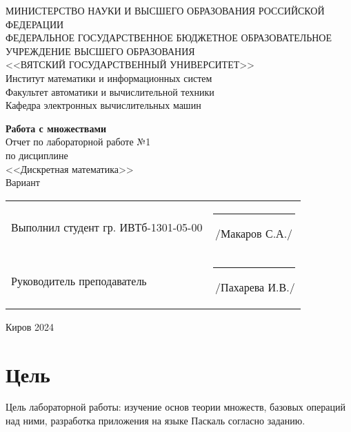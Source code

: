 \documentclass[a4paper,14pt]{extarticle}
\begin{document}
	\newpage\thispagestyle{empty}
	\begin{center}
		\MakeUppercase{
			Министерство науки и высшего образования Российской Федерации\\
			Федеральное государственное бюджетное образовательное учреждение высшего образования\\
			<<Вятский Государственный Университет>>\\
		}
		Институт математики и информационных систем\\
		Факультет автоматики и вычислительной техники\\
		Кафедра электронных вычислительных машин
	\end{center}
	\vfill
	
	\begin{center}
		\textbf{Работа с множествами}\\
		Отчет по лабораторной работе №1\\
		по дисциплине\\
		<<Дискретная математика>>\\
		Вариант 
	\end{center}
	\vfill
	
	\noindent
	\begin{tabular}{ll}
		Выполнил студент гр. ИВТб-1301-05-00 \hspace{5mm} &
		\rule[-1mm]{25mm}{0.10mm}\,/Макаров С.А./\\
		
		Руководитель преподаватель & \rule[-1mm]{25mm}{0.10mm}\,/Пахарева И.В./\\
	\end{tabular}
	
	\vfill
	\begin{center}
		Киров 2024
	\end{center}
	
	\newpage
	\section*{Цель}
	Цель лабораторной работы: изучение основ теории множеств, базовых операций над ними, разработка приложения на языке Паскаль согласно заданию.
	
\end{document}
